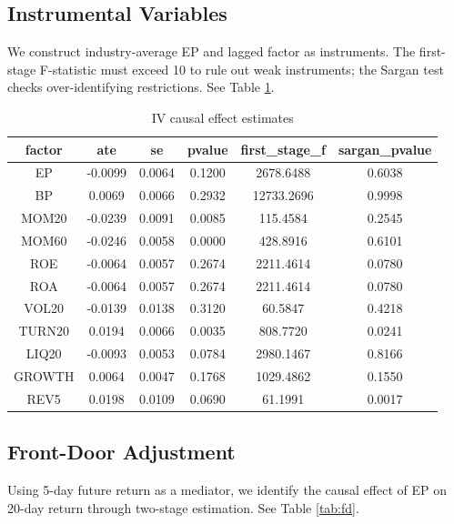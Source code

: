 \documentclass[12pt,a4paper]{article}
\begin{document}
\subsection{Instrumental Variables}
We construct industry-average EP and lagged factor as instruments. The first-stage F-statistic must exceed 10 to rule out weak instruments; the Sargan test checks over-identifying restrictions. See Table \ref{tab:iv}.

\begin{table}[htbp]
\centering
\caption{IV causal effect estimates}
\label{tab:iv}
\begin{tabular}{cccccc}
\toprule
factor & ate & se & pvalue & first\_stage\_f & sargan\_pvalue \\ 
\midrule
EP & -0.0099 & 0.0064 & 0.1200 & 2678.6488 & 0.6038 \\ 
BP & 0.0069 & 0.0066 & 0.2932 & 12733.2696 & 0.9998 \\ 
MOM20 & -0.0239 & 0.0091 & 0.0085 & 115.4584 & 0.2545 \\ 
MOM60 & -0.0246 & 0.0058 & 0.0000 & 428.8916 & 0.6101 \\ 
ROE & -0.0064 & 0.0057 & 0.2674 & 2211.4614 & 0.0780 \\ 
ROA & -0.0064 & 0.0057 & 0.2674 & 2211.4614 & 0.0780 \\ 
VOL20 & -0.0139 & 0.0138 & 0.3120 & 60.5847 & 0.4218 \\ 
TURN20 & 0.0194 & 0.0066 & 0.0035 & 808.7720 & 0.0241 \\ 
LIQ20 & -0.0093 & 0.0053 & 0.0784 & 2980.1467 & 0.8166 \\ 
GROWTH & 0.0064 & 0.0047 & 0.1768 & 1029.4862 & 0.1550 \\ 
REV5 & 0.0198 & 0.0109 & 0.0690 & 61.1991 & 0.0017 \\ 
\bottomrule
\end{tabular}
\end{table}

\subsection{Front-Door Adjustment}
Using 5-day future return as a mediator, we identify the causal effect of EP on 20-day return through two-stage estimation. See Table \ref{tab:fd}.
\end{document}
